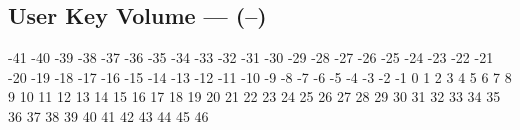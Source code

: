 \subsection[User Key Volume]{User Key Volume --- \UiKey{\I}\UiKey{\SET}(--)}
-41
-40
-39
-38
-37
-36
-35
-34
-33
-32
-31
-30
-29
-28
-27
-26
-25
-24
-23
-22
-21
-20
-19
-18
-17
-16
-15
-14
-13
-12
-11
-10
-9
-8
-7
-6
-5
-4
-3
-2
-1
0
1
2
3
4
5
6
7
8
9
10
11
12
13
14
15
16
17
18
19
20
21
22
23
24
25
26
27
28
29
30
31
32
33
34
35
36
37
38
39
40
41
42
43
44
45
46
